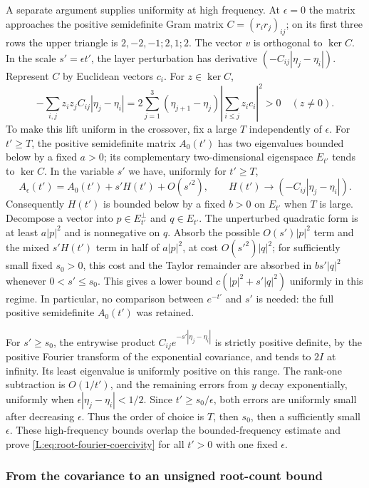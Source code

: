 \documentclass[11pt]{article}
\numberwithin{equation}{section}
\theoremstyle{definition}\newtheorem{definition}[theorem]{Definition}
\theoremstyle{remark}\newtheorem{remark}[theorem]{Remark}
\begin{document}
A separate argument supplies uniformity at high frequency. At
$\epsilon=0$ the matrix approaches the positive semidefinite Gram
matrix $C=(r_ir_j)_{ij}$; on its first three rows the upper triangle is
$2,-2,-1;2,1;2$. The vector $v$ is orthogonal to $\ker C$. In the scale
$s'=\epsilon t'$, the layer perturbation has derivative
$(-C_{ij}|\eta_j-\eta_i|)$. Represent $C$ by Euclidean vectors $c_i$.
For $z\in\ker C$,
\[
 -\sum_{i,j}z_iz_jC_{ij}|\eta_j-\eta_i|
 =2\sum_{j=1}^3(\eta_{j+1}-\eta_j)
       \left|\sum_{i\le j}z_ic_i\right|^2>0
 \quad(z\ne0).
\]
To make this lift uniform in the crossover, fix a large $T$ independently
of $\epsilon$. For $t'\ge T$, the positive semidefinite matrix
$A_0(t')$ has two eigenvalues bounded below by a fixed $a>0$; its
complementary two-dimensional eigenspace $E_{t'}$ tends to $\ker C$.
In the variable $s'$ we have, uniformly for $t'\ge T$,
\[
 A_\epsilon(t')=A_0(t')+s'H(t')+O(s'^2),
 \qquad H(t')\longrightarrow(-C_{ij}|\eta_j-\eta_i|).
\]
Consequently $H(t')$ is bounded below by a fixed $b>0$ on $E_{t'}$
when $T$ is large. Decompose a vector into $p\in E_{t'}^\perp$ and
$q\in E_{t'}$. The unperturbed quadratic form is at least
$a|p|^2$ and is nonnegative on $q$. Absorb the possible
$O(s')|p|^2$ term and the mixed $s'H(t')$ term in half of
$a|p|^2$, at cost $O(s'^2)|q|^2$; for sufficiently small
fixed $s_0>0$, this cost and the Taylor remainder are absorbed in
$b s'|q|^2$ whenever $0<s'\le s_0$. This gives a lower bound
$c(|p|^2+s'|q|^2)$ uniformly in this regime. In particular, no comparison
between $e^{-t'}$ and $s'$ is needed: the full positive semidefinite
$A_0(t')$ was retained.

For $s'\ge s_0$, the entrywise product
$C_{ij}e^{-s'|\eta_j-\eta_i|}$ is strictly positive definite, by the
positive Fourier transform of the exponential covariance, and tends to
$2I$ at infinity. Its least eigenvalue is uniformly positive on this
range. The rank-one subtraction is $O(1/t')$, and the remaining errors
from $y$ decay exponentially, uniformly when
$\epsilon|\eta_j-\eta_i|<1/2$. Since $t'\ge s_0/\epsilon$, both
errors are uniformly small after decreasing $\epsilon$. Thus the order
of choice is $T$, then $s_0$, then a sufficiently small $\epsilon$.
These high-frequency
bounds overlap the bounded-frequency estimate and prove
\eqref{L:eq:root-fourier-coercivity} for all $t'>0$ with one fixed
$\epsilon$.

\subsubsection*{From the covariance to an unsigned root-count bound}
\end{document}
